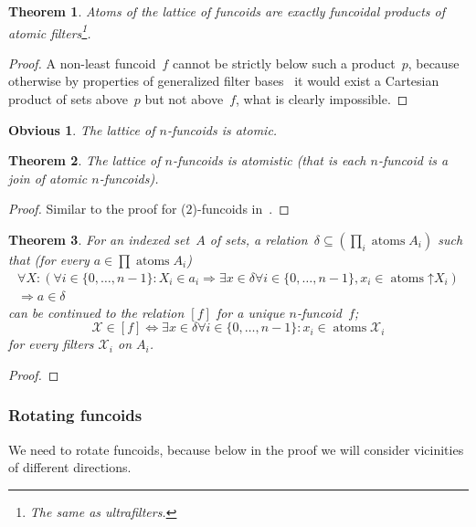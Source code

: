 \documentclass[oneside,draft]{amsart}
\newcommand{\atoms}{\operatorname{atoms}}
\newcommand{\suprel}[1]{\left[#1\right]}
\newtheorem{thm}{Theorem}
\newtheorem{obvious}{Obvious}
\begin{document}
\begin{thm}
Atoms of the lattice of funcoids are exactly funcoidal products of atomic filters\footnote{The same as ultrafilters.}.
\end{thm}

\begin{proof}
A non-least funcoid~$f$ cannot be strictly below such a product~$p$, because otherwise by properties of generalized filter bases~\cite{volume-1} it would exist a Cartesian product of sets above~$p$ but not above~$f$, what is clearly impossible.
\end{proof}

\begin{obvious}
The lattice of $n$-fun\-co\-ids is atomic.
\end{obvious}

\begin{thm}
The lattice of $n$-fun\-co\-ids is atomistic (that is each $n$-fun\-co\-id is a join of atomic $n$-fun\-co\-ids).
\end{thm}

\begin{proof}
Similar to the proof for ($2$)-fun\-co\-ids in~\cite{volume-1}.
\end{proof}

\begin{thm}
For an indexed set~$A$ of sets, a relation~$\delta\subseteq(\prod_i\atoms A_i)$ such that (for every $a\in\prod\atoms A_i$)
\begin{multline*}
\forall X:(\forall i\in\{0,\dots,n-1\}:X_i\in a_i\Rightarrow\exists x\in\delta\forall i\in\{0,\dots,n-1\}, x_i\in\atoms\mathord{\uparrow}X_i)
\\\Rightarrow a\in\delta
\end{multline*}
can be continued to the relation $\suprel{f}$ for a unique $n$-fun\-co\-id~$f$;
\[ \mathcal{X}\in\suprel{f} \Leftrightarrow \exists x\in\delta\forall i\in\{0,\dots,n-1\}:x_i\in\atoms\mathcal{X}_i \]
for every filters $\mathcal{X}_i$ on $A_i$.
\end{thm}

\begin{proof}
\end{proof}

\subsubsection{Rotating funcoids}

We need to rotate funcoids, because below in the proof we will consider vicinities of different directions.
\end{document}
